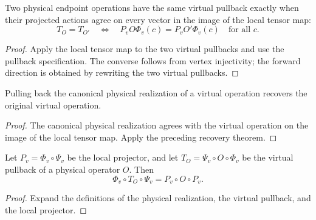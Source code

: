 \begin{theorem}%
    \label{thm:peps_localVirtualOpOfPhysicalOp_eq_of_projected_action_eq}
    \leanok
    Two physical endpoint operations have the same virtual pullback exactly when
    their projected actions agree on every vector in the image of the local
    tensor map:
    \[
        T_O = T_{O'}
        \quad\Longleftrightarrow\quad
        P_v O \Phi_v(c)=P_v O'\Phi_v(c)
        \quad\text{for all }c.
    \]
\end{theorem}
\begin{proof}\leanok
    Apply the local tensor map to the two virtual pullbacks and use the
    pullback specification. The converse follows from vertex injectivity; the
    forward direction is obtained by rewriting the two virtual pullbacks.
\end{proof}

\begin{theorem}%
    \label{thm:peps_localVirtualOpOfPhysicalOp_physRealizeLocalOp}
    \leanok
    Pulling back the canonical physical realization of a virtual operation
    recovers the original virtual operation.
\end{theorem}
\begin{proof}\leanok
    The canonical physical realization agrees with the virtual operation on
    the image of the local tensor map. Apply the preceding recovery theorem.
\end{proof}

\begin{theorem}%
    \label{thm:peps_physRealizeLocalOp_localVirtualOpOfPhysicalOp}
    \leanok
    Let $P_v=\Phi_v\circ\Psi_v$ be the local projector, and let
    $T_O=\Psi_v\circ O\circ\Phi_v$ be the virtual pullback of a physical
    operator $O$. Then
    \[
        \Phi_v\circ T_O\circ\Psi_v
        = P_v\circ O\circ P_v.
    \]
\end{theorem}
\begin{proof}\leanok
    Expand the definitions of the physical realization, the virtual pullback,
    and the local projector.
\end{proof}


